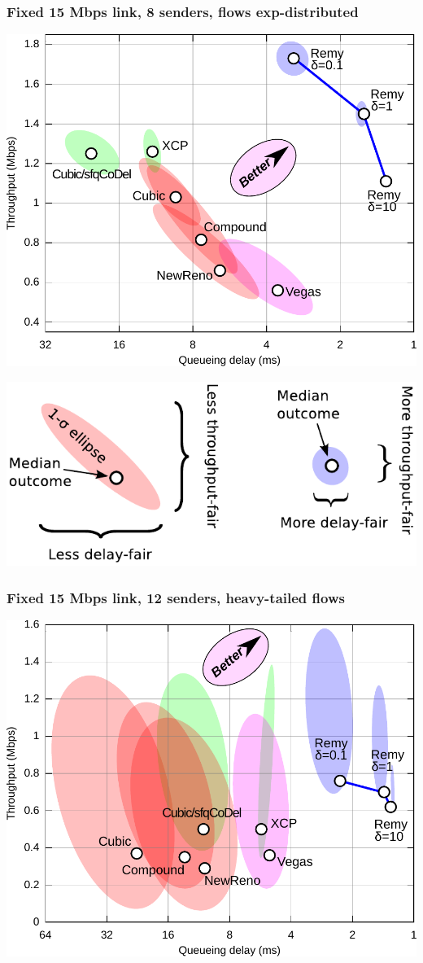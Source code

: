 \documentclass[svgnames]{beamer}
\begin{document}
\begin{frame}
\frametitle{Fixed 15 Mbps link, 8 senders, flows exp-distributed}

\noindent \includegraphics[width=8.5 cm]{eth8-final-bytes.pdf}

\end{frame}

\begin{frame}

\noindent \includegraphics[width=8.5 cm]{legend.pdf}

\end{frame}

\begin{frame}
\frametitle{Fixed 15 Mbps link, 12 senders, heavy-tailed flows}

\noindent \includegraphics[width=8.5 cm]{eth12-final-flowcdf.pdf}

\end{frame}
\end{document}
